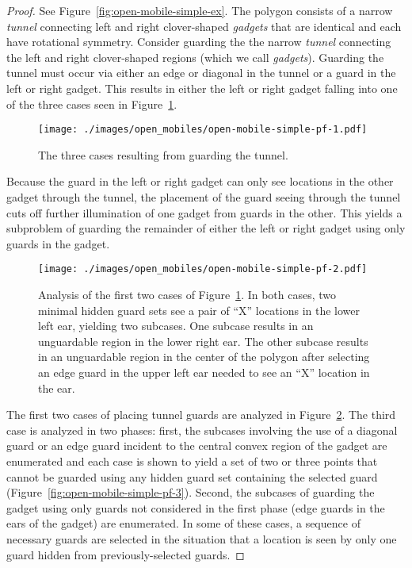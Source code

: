 \documentclass{cccg12}
\begin{document}
\begin{proof}
See Figure~\ref{fig:open-mobile-simple-ex}.
The polygon consists of a narrow \emph{tunnel} connecting left and right clover-shaped \emph{gadgets} that are identical and each have  rotational symmetry.
Consider guarding the the narrow \emph{tunnel} connecting the left and right clover-shaped regions (which we call \emph{gadgets}).
Guarding the tunnel must occur via either an edge or diagonal in the tunnel or a guard in the left or right gadget.
This results in either the left or right gadget falling into one of the three cases seen in Figure~\ref{fig:open-mobile-simple-pf-1}. 

\begin{figure}[ht]
\centering
\texttt{[image: ./images/open\_mobiles/open-mobile-simple-pf-1.pdf]}
\caption{The three cases resulting from guarding the tunnel.}
\label{fig:open-mobile-simple-pf-1}
\end{figure}

Because the guard in the left or right gadget can only see locations in the other gadget through the tunnel, the placement of the guard seeing through the tunnel cuts off further illumination of one gadget from guards in the other.
This yields a subproblem of guarding the remainder of either the left or right gadget using only guards in the gadget.

\begin{figure}[ht]
\centering
\texttt{[image: ./images/open\_mobiles/open-mobile-simple-pf-2.pdf]}
\caption{Analysis of the first two cases of Figure~\ref{fig:open-mobile-simple-pf-1}.
In both cases, two minimal hidden guard sets see a pair of ``X'' locations in the lower left ear, yielding two subcases.
One subcase results in an unguardable region in the lower right ear.
The other subcase results in an unguardable region in the center of the polygon after selecting an edge guard in the upper left ear needed to see an ``X'' location in the ear.} 
\label{fig:open-mobile-simple-pf-2}
\end{figure}

The first two cases of placing tunnel guards are analyzed in Figure~\ref{fig:open-mobile-simple-pf-2}.
The third case is analyzed in two phases: first, the subcases involving the use of a diagonal guard or an edge guard incident to the central convex region of the gadget are enumerated and each case is shown to yield a set of two or three points that cannot be guarded using any hidden guard set containing the selected guard (Figure~\ref{fig:open-mobile-simple-pf-3}).
Second, the subcases of guarding the gadget using only guards not considered in the first phase (edge guards in the ears of the gadget) are enumerated.
In some of these cases, a sequence of necessary guards are selected in the situation that a location is seen by only one guard hidden from previously-selected guards.
 

\end{proof}
\end{document}
